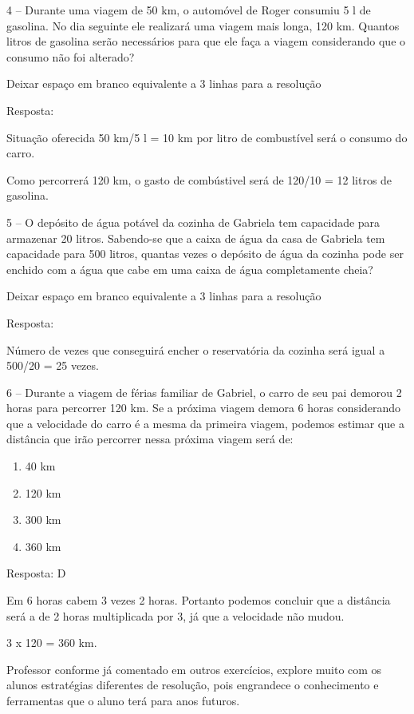 4 -- Durante uma viagem de 50 km, o automóvel de Roger consumiu 5 l de
gasolina. No dia seguinte ele realizará uma viagem mais longa, 120 km.
Quantos litros de gasolina serão necessários para que ele faça a viagem
considerando que o consumo não foi alterado?

Deixar espaço em branco equivalente a 3 linhas para a resolução

Resposta:

Situação oferecida 50 km/5 l = 10 km por litro de combustível será o
consumo do carro.

Como percorrerá 120 km, o gasto de combústivel será de 120/10 = 12
litros de gasolina.

5 -- O depósito de água potável da cozinha de Gabriela tem capacidade
para armazenar 20 litros. Sabendo-se que a caixa de água da casa de
Gabriela tem capacidade para 500 litros, quantas vezes o depósito de
água da cozinha pode ser enchido com a água que cabe em uma caixa de
água completamente cheia?

Deixar espaço em branco equivalente a 3 linhas para a resolução

Resposta:

Número de vezes que conseguirá encher o reservatória da cozinha será
igual a 500/20 = 25 vezes.

6 -- Durante a viagem de férias familiar de Gabriel, o carro de seu pai
demorou 2 horas para percorrer 120 km. Se a próxima viagem demora 6
horas considerando que a velocidade do carro é a mesma da primeira
viagem, podemos estimar que a distância que irão percorrer nessa próxima
viagem será de:

\begin{enumerate}
\def\labelenumi{\alph{enumi})}
\item
  40 km
\item
  120 km
\item
  300 km
\item
  360 km
\end{enumerate}

Resposta: D

Em 6 horas cabem 3 vezes 2 horas. Portanto podemos concluir que a
distância será a de 2 horas multiplicada por 3, já que a velocidade não
mudou.

3 x 120 = 360 km.

Professor conforme já comentado em outros exercícios, explore muito com
os alunos estratégias diferentes de resolução, pois engrandece o
conhecimento e ferramentas que o aluno terá para anos futuros.

